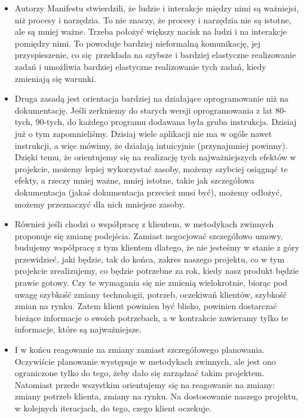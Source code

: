 \begin{itemize}
	\item Autorzy Manifestu stwierdzili, że ludzie i interakcje między nimi są ważniejsi,
	niż procesy i narzędzia. To nie znaczy, że procesy i narzędzia nie są istotne,
	ale są mniej ważne. Trzeba położyć większy nacisk na ludzi i na interakcje pomiędzy nimi.
	To powoduje bardziej nieformalną komunikację, jej przyspieszenie, co się przekłada
	na szybsze i bardziej elastyczne realizowanie zadań i umożliwia bardziej
	elastyczne realizowanie tych zadań, kiedy zmieniają się warunki.
	\item Druga zasadą jest orientacja bardziej na działające oprogramowanie niż na dokumentację.
	Jeśli zerkniemy do starych wersji oprogramowania z lat 80-tych, 90-tych,
	do każdego programu dodawana była gruba instrukcja.
	Dzisiaj już o tym zapomnieliśmy. Dzisiaj wiele aplikacji nie ma w ogóle nawet instrukcji,
	a więc mówimy, że działają intuicyjnie (przynajmniej powinny).
	Dzięki temu, że orientujemy się na realizację tych najważniejszych efektów w projekcie,
	możemy lepiej wykorzystać zasoby, możemy szybciej osiągnąć te efekty, a rzeczy mniej ważne,
	mniej istotne, takie jak szczegółowa dokumentacja (jakaś dokumentacja przecież musi być),
	możemy odłożyć, możemy przeznaczyć dla nich mniejsze zasoby.
	\item Również jeśli chodzi o współpracę z klientem, w metodykach zwinnych
	proponuje się zmianę podejścia. Zamiast negocjować szczegółowo umowy,
	budujemy współpracę z tym klientem dlatego, że nie jesteśmy w stanie z góry przewidzieć,
	jaki będzie, tak do końca, zakres naszego projektu, co w tym projekcie zrealizujemy,
	co będzie potrzebne za rok, kiedy nasz produkt będzie prawie gotowy.
	Czy te wymagania się nie zmienią wielokrotnie, biorąc pod uwagę szybkość zmiany technologii,
	potrzeb, oczekiwań klientów, szybkość zmian na rynku. Zatem klient powinien być blisko,
	powinien dostarczać bieżące informacje o swoich potrzebach, a w kontrakcie zawieramy tylko te informacje,
	które są najważniejsze.
	\item I w końcu reagowanie na zmiany zamiast szczegółowego planowania.
	Oczywiście planowanie występuje w metodykach zwinnych, ale jest ono ograniczone tylko do tego,
	żeby dało się zarządzać takim projektem. Natomiast przede wszystkim orientujemy się na
	reagowanie na zmiany: zmiany potrzeb klienta, zmiany na rynku. Na dostosowanie naszego projektu,
	w kolejnych iteracjach, do tego, czego klient oczekuje.
\end{itemize}


